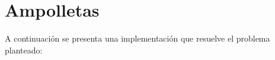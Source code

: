 \section{Ampolletas}

A continuación se presenta una implementación que resuelve el problema planteado:
  

